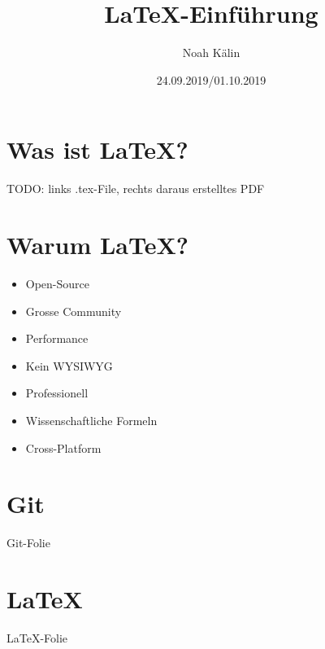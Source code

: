 \documentclass{beamer}
\title{\LaTeX-Einführung}
\author{Noah Kälin}
\date{24.09.2019/01.10.2019}
\begin{document}
\frame{\titlepage}

\section{Was ist \LaTeX?}
\begin{frame}
TODO: links .tex-File, rechts daraus erstelltes PDF
\end{frame}

\section{Warum \LaTeX?}
\begin{frame}
\begin{itemize}
	\item Open-Source
	\item Grosse Community
	\item Performance
	\item Kein WYSIWYG
	\item Professionell
	\item Wissenschaftliche Formeln
	\item Cross-Platform
\end{itemize}
\end{frame}

\section{Git}
\begin{frame}
Git-Folie
\end{frame}

\section{\LaTeX}
\begin{frame}
\LaTeX-Folie
\end{frame}
\end{document}
